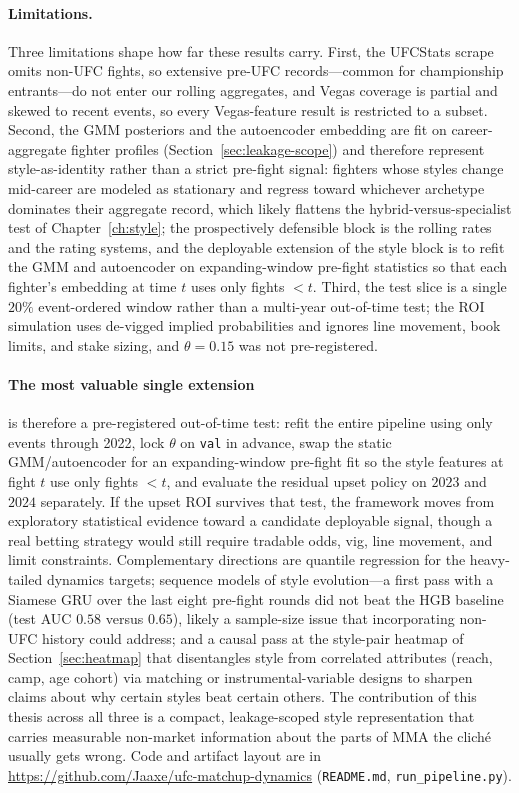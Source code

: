 \documentclass[12pt,oneside]{report}
\begin{document}
\paragraph{Limitations.}  Three limitations shape how far these
results carry.  First, the UFCStats scrape omits non-UFC fights, so
extensive pre-UFC records---common for championship entrants---do
not enter our rolling aggregates, and Vegas coverage is partial and
skewed to recent events, so every Vegas-feature result is
restricted to a subset.  Second, the GMM posteriors and the
autoencoder embedding are fit on career-aggregate fighter profiles
(Section~\ref{sec:leakage-scope}) and therefore represent
style-as-identity rather than a strict pre-fight signal: fighters
whose styles change mid-career are modeled as stationary and
regress toward whichever archetype dominates their aggregate
record, which likely flattens the hybrid-versus-specialist test of
Chapter~\ref{ch:style}; the prospectively defensible block is the
rolling rates and the rating systems, and the deployable extension
of the style block is to refit the GMM and autoencoder on
expanding-window pre-fight statistics so that each fighter's
embedding at time $t$ uses only fights $<t$.  Third, the test slice
is a single $20\%$ event-ordered window rather than a multi-year
out-of-time test; the ROI simulation uses de-vigged implied
probabilities and ignores line movement, book limits, and stake
sizing, and \(\theta = 0.15\) was not pre-registered.

\paragraph{The most valuable single extension} is therefore a
pre-registered out-of-time test: refit the entire pipeline using
only events through 2022, lock \(\theta\) on \texttt{val} in advance,
swap the static GMM/autoencoder for an expanding-window pre-fight
fit so the style features at fight $t$ use only fights $<t$, and
evaluate the residual upset policy on $2023$ and $2024$ separately.
If the upset ROI survives that test, the framework moves from
exploratory statistical evidence toward a candidate deployable signal, though a real betting strategy would still require tradable odds, vig, line movement, and limit constraints.  Complementary directions are quantile
regression for the heavy-tailed dynamics targets; sequence models
of style evolution---a first pass with a Siamese GRU
\citep{bromley1994signature,cho2014learning} over the last eight
pre-fight rounds did not beat the HGB baseline (test AUC $0.58$
versus $0.65$), likely a sample-size issue that incorporating non-UFC history
could address; and a causal pass at the style-pair heatmap of
Section~\ref{sec:heatmap} that disentangles style from correlated
attributes (reach, camp, age cohort) via matching or
instrumental-variable designs to sharpen claims about why
certain styles beat certain others.  The contribution of this
thesis across all three is a compact, leakage-scoped style
representation that carries measurable non-market information about the
parts of MMA the cliché usually gets wrong.  Code and artifact layout are in \url{https://github.com/Jaaxe/ufc-matchup-dynamics} (\texttt{README.md}, \texttt{run\_pipeline.py}).

\clearpage\singlespacing


\end{document}
